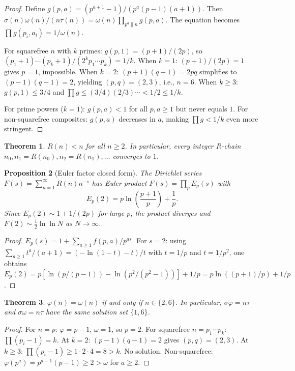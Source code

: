 \documentclass[11pt]{amsart}
\newtheorem{theorem}{Theorem}
\newtheorem{proposition}[theorem]{Proposition}
\theoremstyle{remark}
\begin{document}
\begin{proof}
Define $g(p,a) = (p^{a+1}-1)/(p^a(p-1)(a+1))$.
Then $\sigma(n)\omega(n)/(n\tau(n)) = \omega(n) \prod_{p^a\|n} g(p,a)$.
The equation becomes $\prod g(p_i,a_i) = 1/\omega(n)$.

For squarefree $n$ with $k$ primes: $g(p,1)=(p+1)/(2p)$, so
$(p_1\!+\!1)\cdots(p_k\!+\!1)/(2^k p_1\cdots p_k) = 1/k$.
When $k=1$: $(p+1)/(2p)=1$ gives $p=1$, impossible.
When $k=2$: $(p+1)(q+1)=2pq$ simplifies to $(p-1)(q-1)=2$,
yielding $(p,q)=(2,3)$, i.e., $n=6$.
When $k \geq 3$: $g(p,1) \leq 3/4$ and $\prod g \leq (3/4)(2/3)\cdots < 1/2 \leq 1/k$.

For prime powers ($k=1$): $g(p,a)<1$ for all $p,a \geq 1$ but never equals $1$.
For non-squarefree composites: $g(p,a)$ decreases in $a$,
making $\prod g < 1/k$ even more stringent.
\end{proof}

\begin{theorem}\label{thm:decrease}
$R(n) < n$ for all $n \geq 2$. In particular, every integer $R$-chain
$n_0, n_1 = R(n_0), n_2 = R(n_1), \ldots$ converges to $1$.
\end{theorem}

\begin{proposition}[Euler factor closed form]\label{prop:euler}
The Dirichlet series $F(s) = \sum_{n=1}^\infty R(n) n^{-s}$
has Euler product $F(s) = \prod_p E_p(s)$ with
\[
  E_p(2) = p \ln\!\left(\frac{p+1}{p}\right) + \frac{1}{p}.
\]
Since $E_p(2) \sim 1 + 1/(2p)$ for large $p$, the product diverges
and $F(2) \sim \tfrac{1}{2}\ln\ln N$ as $N \to \infty$.
\end{proposition}

\begin{proof}
$E_p(s) = 1 + \sum_{a \geq 1} f(p,a)/p^{as}$.
For $s=2$: using $\sum_{a \geq 1} t^a/(a+1) = (-\ln(1-t)-t)/t$
with $t = 1/p$ and $t = 1/p^2$, one obtains
$E_p(2) = p[\ln(p/(p-1)) - \ln(p^2/(p^2-1))] + 1/p = p\ln((p+1)/p) + 1/p$.
\end{proof}

\begin{theorem}\label{thm:phi-omega}
$\varphi(n) = \omega(n)$ if and only if $n \in \{2, 6\}$.
In particular, $\sigma\varphi = n\tau$ and $\sigma\omega = n\tau$
have the same solution set $\{1, 6\}$.
\end{theorem}

\begin{proof}
For $n = p$: $\varphi = p-1$, $\omega = 1$, so $p = 2$.
For squarefree $n = p_1 \cdots p_k$: $\prod(p_i - 1) = k$.
At $k=2$: $(p-1)(q-1) = 2$ gives $(p,q) = (2,3)$.
At $k \geq 3$: $\prod(p_i-1) \geq 1 \cdot 2 \cdot 4 = 8 > k$. No solution.
Non-squarefree: $\varphi(p^a) = p^{a-1}(p-1) \geq 2 > \omega$ for $a \geq 2$.
\end{proof}
\end{document}
